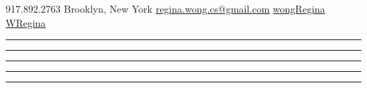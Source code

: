 \documentclass[]{deedy-resume-openfont}
\begin{document}
%
%

%
%

{ \faMobilePhone \hspace{0.4 cm} 917.892.2763}
{ \faMapMarker \hspace{0.4 cm} Brooklyn, New York}
{\href{mailto:regina.wong.cs@gmail.com}{ \faEnvelopeSquare \hspace{0.1 in} regina.wong.cs@gmail.com}}
{ \href{https://github.com/wongRegina}{\faGithubSquare\hspace{0.1 in} wongRegina}}
{\href{https://www.linkedin.com/in/wregina}{ \faLinkedinSquare \hspace{0.1 in} WRegina}}




\vspace{-.25 mm}
\hrule
\vspace{-.25 mm}

\vspace{-.25 mm}
\hrule
\vspace{-.25 mm}

\vspace{-.25 mm}
\hrule
\vspace{-.25 mm}

\vspace{-.25 mm}
\hrule
\vspace{-.25 mm}

\vspace{-.25 mm}
\hrule
\vspace{-.25 mm}

\end{document}
